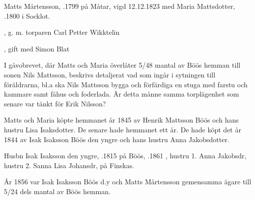 Matts Mårtensson, .1799 på Måtar, vigd 12.12.1823 med  Maria Mattsdotter, .1800 i Socklot.
\begin{jhchildren}
  \item {}
  \item {}
  \item {}, g. m. torparen Carl Petter Wikktelin
  \item {}
  \item {}, gift med Simon Blat
  \item {}
\end{jhchildren}
I gåvobrevet, där Matts och Maria överlåter 5/48 mantal av Böös hemman till sonen Nils Mattsson, beskrivs detaljerat vad som ingår i sytningen till föräldrarna, bl.a ska Nils Mattsson bygga och förfärdiga en stuga med farstu och kammare samt fähus och foderlada. Är detta månne samma torplägenhet som senare var tänkt för Erik Nilsson?

Matts och Maria köpte hemmanet år 1845 av Henrik Mattsson Böös och hans hustru Lisa Isaksdotter. De senare hade hemmanet ett år. De hade köpt det år 1844 av Isak Isaksson Böös den yngre och hans hustru Anna Jakobsdotter.


Husbn Isak Isaksson den yngre, .1815 på Böös, .1861 , hustru 1. Anna Jakobsdr, hustru 2. Sanna Lisa Johansdr,  på Finskas.
\begin{jhchildren}
  \item {}
  \item {}
  \item {}
  \item {}
  \item {}
  \item {}
  \item {}
  \item {}
\end{jhchildren}
År 1856 var Isak Isaksson Böös d.y och Matts Mårtensson gemensamma ägare till 5/24 dels mantal av Böös hemman.



